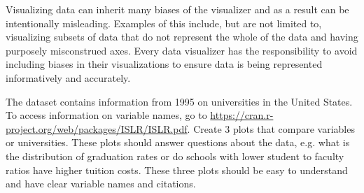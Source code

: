 \begin{warn}
Visualizing data can inherit many biases of the visualizer and as a result can be intentionally misleading.
Examples of this include, but are not limited to, visualizing subsets of data that do not represent the whole of the data and having purposely misconstrued axes.
Every data visualizer has the responsibility to avoid including biases in their visualizations to ensure data is being represented informatively and accurately.
\end{warn}
\begin{problem}
The dataset  contains information from 1995 on universities in the United States.
To access information on variable names, go to \url{https://cran.r-project.org/web/packages/ISLR/ISLR.pdf}.
Create 3 plots that compare variables or universities.
These plots should answer questions about the data, e.g. what is the distribution of graduation rates or do schools with lower student to faculty ratios have higher tuition costs.
These three plots should be easy to understand and have clear variable names and citations.
\end{problem}

